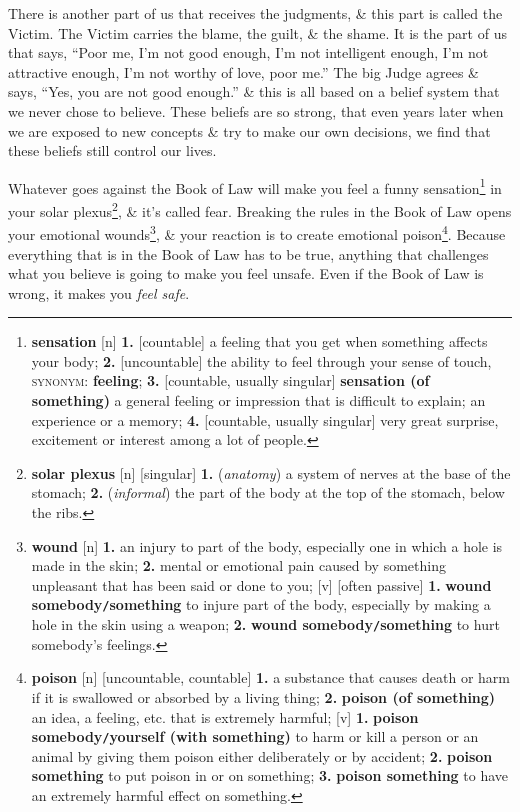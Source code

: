 \documentclass[oneside]{book}
\numberwithin{equation}{section}
\begin{document}
There is another part of us that receives the judgments, \& this part is called the Victim. The Victim carries the blame, the guilt, \& the shame. It is the part of us that says, ``Poor me, I'm not good enough, I'm not intelligent enough, I'm not attractive enough, I'm not worthy of love, poor me.'' The big Judge agrees \& says, ``Yes, you are not good enough.'' \& this is all based on a belief system that we never chose to believe. These beliefs are so strong, that even years later when we are exposed to new concepts \& try to make our own decisions, we find that these beliefs still control our lives.

Whatever goes against the Book of Law will make you feel a funny sensation\footnote{\textbf{sensation} [n] \textbf{1.} [countable] a feeling that you get when something affects your body; \textbf{2.} [uncountable] the ability to feel through your sense of touch, \textsc{synonym}: \textbf{feeling}; \textbf{3.} [countable, usually singular] \textbf{sensation (of something)} a general feeling or impression that is difficult to explain; an experience or a memory; \textbf{4.} [countable, usually singular] very great surprise, excitement or interest among a lot of people.} in your solar plexus\footnote{\textbf{solar plexus} [n] [singular] \textbf{1.} (\textit{anatomy}) a system of nerves at the base of the stomach; \textbf{2.} (\textit{informal}) the part of the body at the top of the stomach, below the ribs.}, \& it's called fear. Breaking the rules in the Book of Law opens your emotional wounds\footnote{\textbf{wound} [n] \textbf{1.} an injury to part of the body, especially one in which a hole is made in the skin; \textbf{2.} mental or emotional pain caused by something unpleasant that has been said or done to you; [v] [often passive] \textbf{1.} \textbf{wound somebody\texttt{/}something} to injure part of the body, especially by making a hole in the skin using a weapon; \textbf{2.} \textbf{wound somebody\texttt{/}something} to hurt somebody's feelings.}, \& your reaction is to create emotional poison\footnote{\textbf{poison} [n] [uncountable, countable] \textbf{1.} a substance that causes death or harm if it is swallowed or absorbed by a living thing; \textbf{2.} \textbf{poison (of something)} an idea, a feeling, etc. that is extremely harmful; [v] \textbf{1.} \textbf{poison somebody\texttt{/}yourself (with something)} to harm or kill a person or an animal by giving them poison either deliberately or by accident; \textbf{2.} \textbf{poison something} to put poison in or on something; \textbf{3.} \textbf{poison something} to have an extremely harmful effect on something.}. Because everything that is in the Book of Law has to be true, anything that challenges what you believe is going to make you feel unsafe. Even if the Book of Law is wrong, it makes you \textit{feel safe}.
\end{document}
